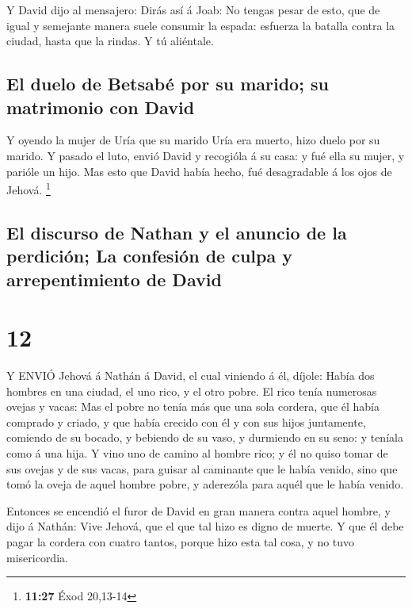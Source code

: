  Y David dijo al mensajero: Dirás así á Joab: No tengas
pesar de esto, que de igual y semejante manera suele consumir la espada:
esfuerza la batalla contra la ciudad, hasta que la rindas. Y tú
aliéntale.

\hypertarget{el-duelo-de-betsabuxe9-por-su-marido-su-matrimonio-con-david}{%
\subsection{El duelo de Betsabé por su marido; su matrimonio con
David}\label{el-duelo-de-betsabuxe9-por-su-marido-su-matrimonio-con-david}}

 Y oyendo la mujer de Uría que su marido Uría era muerto,
hizo duelo por su marido.  Y pasado el luto, envió David y
recogióla á su casa: y fué ella su mujer, y parióle un hijo. Mas esto
que David había hecho, fué desagradable á los ojos de Jehová.
\footnote{\textbf{11:27} Éxod 20,13-14}

\hypertarget{el-discurso-de-nathan-y-el-anuncio-de-la-perdiciuxf3n-la-confesiuxf3n-de-culpa-y-arrepentimiento-de-david}{%
\subsection{El discurso de Nathan y el anuncio de la perdición; La
confesión de culpa y arrepentimiento de
David}\label{el-discurso-de-nathan-y-el-anuncio-de-la-perdiciuxf3n-la-confesiuxf3n-de-culpa-y-arrepentimiento-de-david}}

\hypertarget{section-11}{%
\section{12}\label{section-11}}

 Y ENVIÓ Jehová á Nathán á David, el cual viniendo á él,
díjole: Había dos hombres en una ciudad, el uno rico, y el otro pobre.
 El rico tenía numerosas ovejas y vacas:  Mas el
pobre no tenía más que una sola cordera, que él había comprado y criado,
y que había crecido con él y con sus hijos juntamente, comiendo de su
bocado, y bebiendo de su vaso, y durmiendo en su seno: y teníala como á
una hija.  Y vino uno de camino al hombre rico; y él no
quiso tomar de sus ovejas y de sus vacas, para guisar al caminante que
le había venido, sino que tomó la oveja de aquel hombre pobre, y
aderezóla para aquél que le había venido.

 Entonces se encendió el furor de David en gran manera
contra aquel hombre, y dijo á Nathán: Vive Jehová, que el que tal hizo
es digno de muerte.  Y que él debe pagar la cordera con
cuatro tantos, porque hizo esta tal cosa, y no tuvo misericordia.

